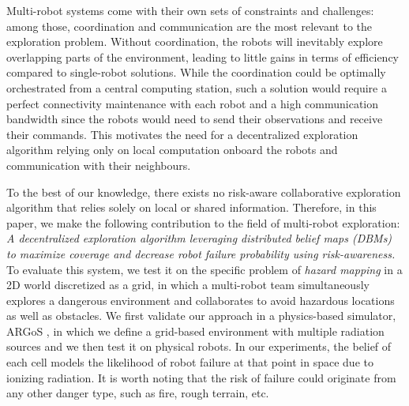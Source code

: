 \documentclass[letterpaper, 10 pt, conference]{ieeeconf}
\begin{document}
Multi-robot systems come with their own sets of constraints and
challenges: among those, coordination and communication are the most
relevant to the exploration problem. Without coordination, the robots
will inevitably explore overlapping parts of the environment, leading
to little gains in terms of efficiency compared to single-robot
solutions. While the coordination could be optimally orchestrated from
a central computing station, such a solution would require a perfect
connectivity maintenance with each robot and a high communication
bandwidth since the robots would need to send their observations and
receive their commands. This motivates the need for a decentralized
exploration algorithm relying only on local computation onboard the
robots and communication with their neighbours.

To the best of our knowledge, there exists no risk-aware collaborative
exploration algorithm that relies solely on local or shared
information. Therefore, in this paper, we make the following
contribution to the field of multi-robot exploration: \textit{A
  decentralized exploration algorithm leveraging distributed belief
  maps (DBMs) to maximize coverage and decrease robot failure
  probability using risk-awareness.} To
evaluate this system, we test it on the specific problem of
\emph{hazard mapping} in a 2D world discretized as a grid, in which a
multi-robot team simultaneously explores a dangerous environment and
collaborates to avoid hazardous locations as well as obstacles. We
first validate our approach in a physics-based simulator, ARGoS
\cite{Pinciroli:SI2012}, in which we define a grid-based environment
with multiple radiation sources and we then test it on physical
robots. In our experiments, the belief of each cell models the
likelihood of robot failure at that point in space due to ionizing
radiation. It is worth noting that the risk of failure could originate
from any other danger type, such as fire, rough terrain, etc.
\end{document}

